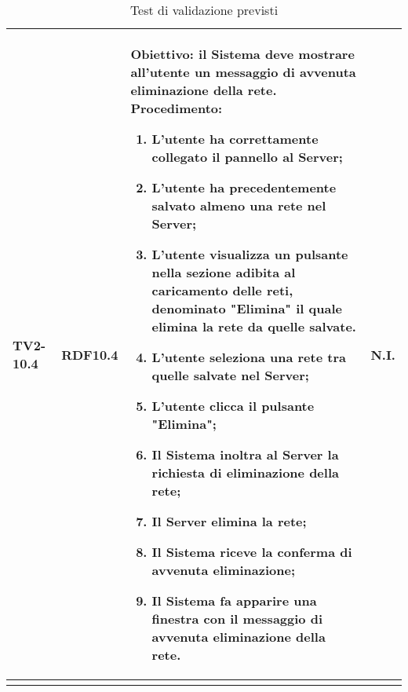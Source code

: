 \begin{longtable}{|C{.15\textwidth}|C{.13\textwidth}|m{.65\textwidth}|C{.08\textwidth}|}
TV2-10.4 & RDF10.4 &
	\textbf{Obiettivo}: il Sistema deve mostrare all'utente un messaggio di avvenuta eliminazione della rete. \newline
	\textbf{Procedimento}:
	\begin{enumerate}
		\item L'utente ha correttamente collegato il pannello al Server;
		\item L'utente ha precedentemente salvato almeno una rete nel Server;
		\item L'utente visualizza un pulsante nella sezione adibita al caricamento delle reti, denominato "Elimina" il quale elimina la rete da quelle salvate.
		\item L'utente seleziona una rete tra quelle salvate nel Server;
		\item L'utente clicca il pulsante "Elimina";
		\item Il Sistema inoltra al Server la richiesta di eliminazione della rete;
		\item Il Server elimina la rete;
		\item Il Sistema riceve la conferma di avvenuta eliminazione;
		\item Il Sistema fa apparire una finestra con il messaggio di avvenuta eliminazione della rete.
	\end{enumerate}
	& N.I. \\
\hline








\caption{Test di validazione previsti}
\label{testvalidazioneprevisti}
\end{longtable}